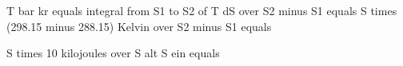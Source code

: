 T bar kr equals integral from S1 to S2 of T dS over S2 minus S1 equals S times (298.15 minus 288.15) Kelvin over S2 minus S1 equals

S times 10 kilojoules over S alt S ein equals